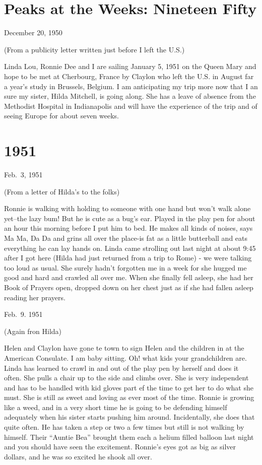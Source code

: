 \documentclass[]{book}
\begin{document}
\hypertarget{peaks-at-the-weeks-nineteen-fifty}{%
\chapter{Peaks at the Weeks: Nineteen Fifty}\label{peaks-at-the-weeks-nineteen-fifty}}

December 20, 1950

(From a publicity letter written just before I left the U.S.)

Linda Lou, Ronnie Dee and I are sailing January 5, 1951 on the Queen Mary and hope to be met at Cherbourg, France by Claylon who left the U.S. in August far a year's study in Brussels, Belgium. I am anticipating my trip more now that I an sure my sister, Hilda Mitchell, is going along. She has a leave of absence from the Methodist Hospital in Indianapolis and will have the experience of the trip and of seeing Europe for about seven weeks.

\hypertarget{section}{%
\chapter{1951}\label{section}}

Feb.~3, 1951

(From a letter of Hilda's to the folks)

Ronnie is walking with holding to someone with one hand but won't walk alone yet--the lazy bum! But he is cute as a bug's ear. Played in the play pen for about an hour this morning before I put him to bed. He makes all kinds of noises, says Ma Ma, Da Da and grins all over the place-is fat as a little butterball and eats everything he can lay hands on. Linda came strolling out last night at about 9:45 after I got here (Hilda had just returned from a trip to Rome) - we were talking too loud as usual. She surely hadn't forgotten me in a week for she hugged me good and hard and crawled all over me. When she finally fell asleep, she had her Book of Prayers open, dropped down on her chest just as if she had fallen asleep reading her prayers.

Feb.~9. 1951

(Again fron Hilda)

Helen and Claylon have gone te town to sign Helen and the children in at the American Consulate. I am baby sitting. Oh! what kids your grandchildren are. Linda has learned to crawl in and out of the play pen by herself and does it often. She pulls a chair up to the side and climbs over. She is very independent and has to be handled with kid gloves part ef the time to get her to do what she must. She is still as sweet and loving as ever most of the time. Ronnie is growing like a weed, and in a very short time he is going to be defending himself adequately when his sister starts pushing him around. Incidentally, she does that quite often. He has taken a step or two a few times but still is not walking by himself. Their ``Auntie Bea'' brought them each a helium filled balloon last night and you should have seen the excitement. Ronnie's eyes got as big as silver dollars, and he was so excited he shook all over.
\end{document}
